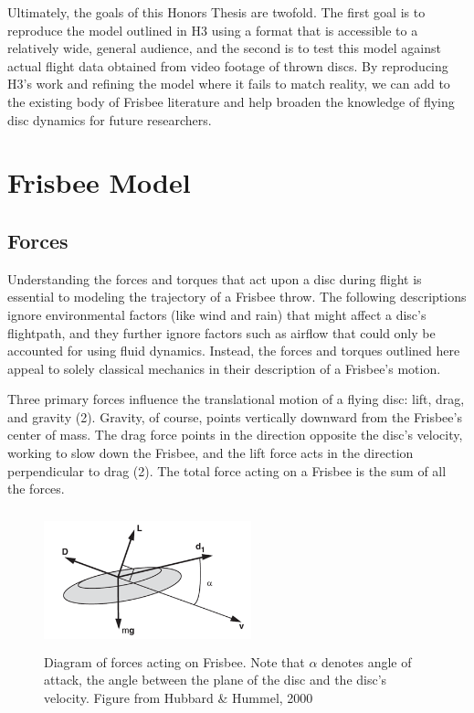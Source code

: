 \documentclass[a4paper,12pt, oneside]{article}
\begin{document}
Ultimately, the goals of this Honors Thesis are twofold. The first goal is to reproduce the model outlined in H3 using a format that is accessible to a relatively wide, general audience, and the second is to test this model against actual flight data obtained from video footage of thrown discs. By reproducing H3's work and refining the model where it fails to match reality, we can add to the existing body of Frisbee literature and help broaden the knowledge of flying disc dynamics for future researchers.

\section{Frisbee Model}

\subsection{Forces}
Understanding the forces and torques that act upon a disc during flight is essential to modeling the trajectory of a Frisbee throw. The following descriptions ignore environmental factors (like wind and rain) that might affect a disc's flightpath, and they further ignore factors such as airflow that could only be accounted for using fluid dynamics. Instead, the forces and torques outlined here appeal to solely classical mechanics in their description of a Frisbee's motion.

Three primary forces influence the translational motion of a flying disc: lift, drag, and gravity (2). Gravity, of course, points vertically downward from the Frisbee's center of mass.  The drag force points in the direction opposite the disc's velocity, working to slow down the Frisbee, and the lift force acts in the direction perpendicular to drag (2). The total force acting on a Frisbee is the sum of all the forces.
\begin{figure}[h]
        \includegraphics[width=6cm, height=4cm]{frisforces}
	\centering
	\caption{Diagram of forces acting on Frisbee. Note that $\alpha$ denotes angle of attack, the angle between the plane of the disc and the disc's velocity. Figure from Hubbard \& Hummel, 2000}
\end{figure}
\end{document}
